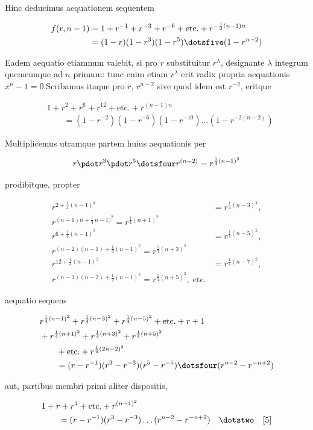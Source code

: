 Hinc deducimus aequationem sequentem


\[
\begin{aligned}
f(r,n-1)&=1+r^{-1}+r^{-3}+r^{-6}+\text{etc.}+r^{-\frac12(n-1)n}\\
&=(1-r)(1-r^3)(1-r^5)\dotsfive(1-r^{n-2})
\end{aligned}
\]

Eadem aequatio etiamnum valebit, si pro $r$ substituitur $r^\lambda$, designante $\lambda$ integrum quemcunque ad $n$ primum: tunc enim etiam $r^\lambda$ erit radix propria aequationis $x^n-1=0$.\quad Scribamus itaque pro $r$, $r^{n-2}$ sive quod idem est $r^{-2}$, eritque

\[
\begin{aligned}
&1+r^2+r^6+r^{12}+\text{etc.}+r^{(n-1)n}\\&\qquad=(1-r^{-2})(1-r^{-6})(1-r^{-10})\ldots(1-r^{-2(n-2)})
\end{aligned}
\]

Multiplicemus utramque partem huius aequationis per

\[
\begin{aligned}
r\pdot r^3\pdot r^5\dotsfour r^{(n-2)}=r^{\frac14(n-1)^2}
\end{aligned}
\]

prodibitque, propter

\[
\begin{aligned}
r^{2+\frac14(n-1)^2}&=r^{\frac14(n-3)^2},\\r^{(n-1)n+\frac14\,n-1)^2}=r^{\frac14(n+1)^2}\\
r^{6+\frac14(n-1)^2}&=r^{\frac14(n-5)^2},\\r^{(n-2)(n-1)+\frac14(n-1)^2}=r^{\frac14(n+3)^2}\\
r^{12+\frac14(n-1)^2}&=r^{\frac14(n-7)^2},\\r^{(n-3)(n-2)+\frac14(n-1)^2}=r^{\frac14(n+5)^2},\;\text{etc.}
\end{aligned}
\]

aequatio sequens

\[
\begin{aligned}
&r^{\frac14(n-1)^2}+r^{\frac14(n-3)^2}+r^{\frac14(n-5)^2}+\text{etc.}+r+1\\
&+r^{\frac14(n+1)^2}+r^{\frac14(n+3)^2}+r^{\frac14(n+5)^2}\\&\qquad+\text{etc.}+r^{\frac14(2n-2)^2}\\
&\qquad=(r-r^{-1})(r^3-r^{-3})(r^5-r^{-5})\dotsfour(r^{n-2}-r^{-n+2})
\end{aligned}
\]

aut, partibus membri primi aliter dispositis,

\[
\begin{aligned}
&1+r+r^4+\text{etc.}+r^{(n-1)^2}\\&\qquad=(r-r^{-1})(r^3-r^{-3})\ldots(r^{n-2}-r^{-n+2})\quad\dotstwo\quad[5]
\end{aligned}
\]
